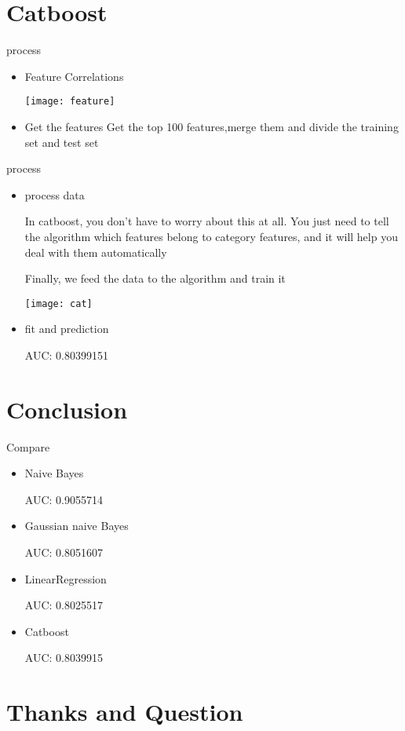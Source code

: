 \documentclass[
 size=12pt,
 paper=smartboard, %
 mode=present, %
 display=slides, %
style=tuliplab,
pauseslide,
fleqn,leqno]{powerdot}
\begin{document}
\section{ Catboost }
\begin{slide}{process}
\begin{itemize}
\item Feature Correlations
\par
\texttt{[image: feature]}
\item Get the features
Get the top 100 features,merge them and divide the training set and test set
\end{itemize}
\end{slide}
\begin{slide}{process}
\begin{itemize}
\item process data
\par
In catboost, you don't have to worry about this at all. You just need to tell the algorithm which features belong to category features, and it will help you deal with them automatically
\par
Finally, we feed the data to the algorithm and train it
\par
\texttt{[image: cat]}
\par
\item fit and prediction
\par
AUC: 0.80399151
\end{itemize}
\end{slide}
\section{Conclusion}
\begin{slide}{Compare}
\begin{itemize}
\item Naive Bayes
\par
AUC: 0.9055714
\item Gaussian naive Bayes
\par
AUC: 0.8051607
\item LinearRegression
\par
AUC: 0.8025517

\item Catboost
\par
AUC: 0.8039915

\end{itemize}
\end{slide}



\section{Thanks and Question}
\end{document}
